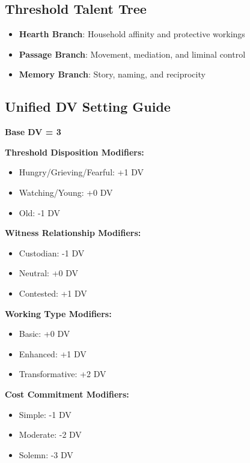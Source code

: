 \documentclass[11pt]{book}
\begin{document}
\subsection*{Threshold Talent Tree}

\begin{itemize}[noitemsep]
    \item \textbf{Hearth Branch}: Household affinity and protective workings
    \item \textbf{Passage Branch}: Movement, mediation, and liminal control
    \item \textbf{Memory Branch}: Story, naming, and reciprocity
\end{itemize}

\subsection*{Unified DV Setting Guide}

\textbf{Base DV = 3}

\textbf{Threshold Disposition Modifiers:}
\begin{itemize}[noitemsep]
    \item Hungry/Grieving/Fearful: +1 DV
    \item Watching/Young: +0 DV
    \item Old: -1 DV
\end{itemize}

\textbf{Witness Relationship Modifiers:}
\begin{itemize}[noitemsep]
    \item Custodian: -1 DV
    \item Neutral: +0 DV
    \item Contested: +1 DV
\end{itemize}

\textbf{Working Type Modifiers:}
\begin{itemize}[noitemsep]
    \item Basic: +0 DV
    \item Enhanced: +1 DV
    \item Transformative: +2 DV
\end{itemize}

\textbf{Cost Commitment Modifiers:}
\begin{itemize}[noitemsep]
    \item Simple: -1 DV
    \item Moderate: -2 DV
    \item Solemn: -3 DV
\end{itemize}
\end{document}
